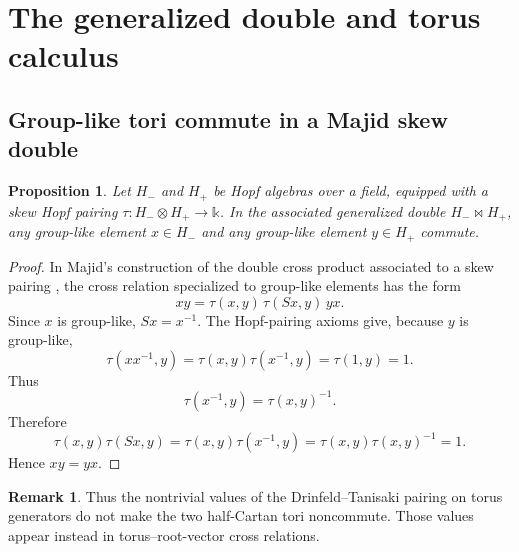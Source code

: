 \documentclass[12pt]{article}
\theoremstyle{plain}
\newtheorem{proposition}[theorem]{Proposition}
\theoremstyle{definition}
\newtheorem{remark}[theorem]{Remark}
\numberwithin{equation}{section}
\newcommand{\bipr}{\bowtie}         %
\begin{document}
\section{The generalized double and torus calculus}
\label{sec:double-torus}

\subsection{Group-like tori commute in a Majid skew double}
\begin{proposition}\label{prop:grouplikes-commute}
Let \(H_-\) and \(H_+\) be Hopf algebras over a field, equipped with a skew Hopf pairing \(\tau:H_-\otimes H_+\to \mathbb{k}\).  In the associated generalized double \(H_-\bipr H_+\), any group-like element \(x\in H_-\) and any group-like element \(y\in H_+\) commute.
\end{proposition}

\begin{proof}
In Majid's construction of the double cross product associated to a skew pairing \cite{Majid}, the cross relation specialized to group-like elements has the form
\[
xy=\tau(x,y)\,\tau(Sx,y)\,yx.
\]
Since \(x\) is group-like, \(Sx=x^{-1}\).  The Hopf-pairing axioms give, because \(y\) is group-like,
\[
\tau(xx^{-1},y)=\tau(x,y)\tau(x^{-1},y)=\tau(1,y)=1.
\]
Thus
\[
\tau(x^{-1},y)=\tau(x,y)^{-1}.
\]
Therefore
\[
\tau(x,y)\tau(Sx,y)
=
\tau(x,y)\tau(x^{-1},y)
=
\tau(x,y)\tau(x,y)^{-1}
=
1.
\]
Hence \(xy=yx\).
\end{proof}

\begin{remark}
Thus the nontrivial values of the Drinfeld--Tanisaki pairing on torus generators do not make the two half-Cartan tori noncommute.  Those values appear instead in torus--root-vector cross relations.
\end{remark}
\end{document}
